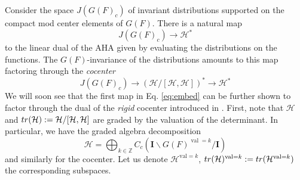 \documentclass{amsart}
\numberwithin{equation}{section}
\newtheorem{theorem}[lemma]{Theorem}%
\theoremstyle{definition}
\def\tr{{\rm tr}}
\def\val{\mathrm{val}}
\newcommand{\cH}{\mathcal{H}}
\newcommand{\bI}{\mathbf{I}}
\newcommand{\Z}{{\mathbb Z}}
\begin{document}
Consider the space $J(G(F)_c)$ of invariant distributions supported on the compact mod center elements of $G(F)$. There is a natural map $$J(G(F)_c)\rightarrow\cH^*$$ to the linear dual of the AHA given by evaluating the distributions on the functions. 
The $G(F)$-invariance of the distributions amounts to this map factoring through the {\em cocenter}
\begin{equation}\label{eq:embed}
J(G(F)_c)\rightarrow(\cH/[\cH,\cH])^*\rightarrow\cH^*
\end{equation}
We will soon see that the first map in Eq. \eqref{eq:embed} can be further shown to factor through the dual of the {\em rigid} cocenter introduced in \cite{CiHe}.
First, note that $\cH$ and $\tr(\cH):=\cH/[\cH,\cH]$ are graded by the valuation of the determinant. In particular, we have the graded algebra decomposition $$\cH=\bigoplus_{k\in\Z} C_c(\bI\backslash G(F)^{\operatorname{val}=k}/\bI)$$ and similarly for the cocenter. Let us denote $\cH^{\val=k}$, $\tr(\cH)^{\val=k}:=\tr(\cH^{\val=k})$ the corresponding subspaces. 
\end{document}

